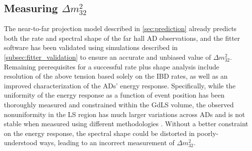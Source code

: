\subsection{Measuring \texorpdfstring{$\Delta m^2_{32}$}{the 3,2 mass splitting}}
\label{subsec:rateplusshape}

The near-to-far projection model described in \cref{sec:prediction}
already predicts both the rate and spectral shape
of the far hall AD observations,
and the fitter software has been validated using simulations
described in \cref{subsec:fitter_validation}
to ensure an accurate and unbiased value of $\Delta m^2_{32}$.
Remaining prerequisites for a successful rate plus shape analysis
include resolution of the above tension based solely on the IBD rates,
as well as an improved characterization of the ADs' energy response.
Specifically, while the uniformity of the energy response
as a function of event position
has been thoroughly measured and constrained within the GdLS volume,
the observed nonuniformity in the LS region
has much larger variations across ADs
and is not stable when measured using different methodologies \cite{beda_nonuniformity}.
Without a better constraint on the energy response,
the spectral shape could be distorted in poorly-understood ways,
leading to an incorrect measurement of $\Delta m^2_{32}$.
